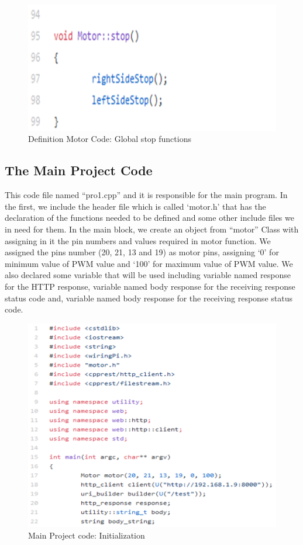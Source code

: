 \documentclass{article}
\begin{document}
\begin{figure}[h]
    \centering
    \includegraphics{figures/67.png}
    \caption{Definition Motor Code: Global stop functions}
    \label{fig:my_label}
\end{figure}

\newpage
\subsection{The Main Project Code}

This code file named “pro1.cpp” and it is responsible for the main program. In the first, we include the header file which is called ‘motor.h’ that has the declaration of the functions needed to be defined and some other include files we in need for them. In the main block, we create an object from “motor” Class with assigning in it the pin numbers and values required in motor function. We assigned the pins number (20, 21, 13 and 19) as motor pins, assigning ‘0’ for minimum value of PWM value and ‘100’ for maximum value of PWM value. We also declared some variable that will be used including variable named response for the HTTP response, variable named body response for the receiving response status code and, variable named body response for the receiving response status code.

\begin{figure}[h]
    \centering
    \includegraphics{figures/68.png}
    \caption{Main Project code: Initialization}
    \label{fig:my_label}
\end{figure}
\end{document}
